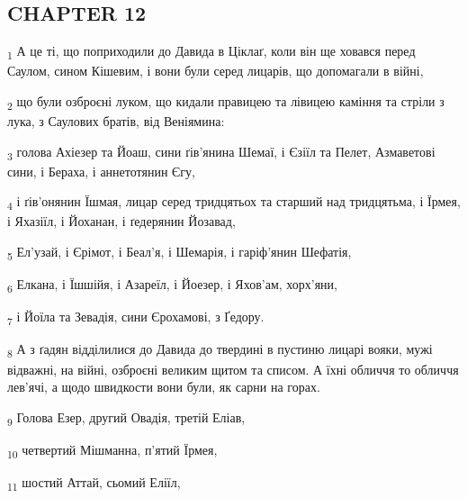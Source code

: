 \subsection{CHAPTER 12}
\begin{tcolorbox}
\textsubscript{1} А це ті, що поприходили до Давида в Ціклаґ, коли він ще ховався перед Саулом, сином Кішевим, і вони були серед лицарів, що допомагали в війні,
\end{tcolorbox}
\begin{tcolorbox}
\textsubscript{2} що були озброєні луком, що кидали правицею та лівицею каміння та стріли з лука, з Саулових братів, від Веніямина:
\end{tcolorbox}
\begin{tcolorbox}
\textsubscript{3} голова Ахіезер та Йоаш, сини ґів'янина Шемаї, і Єзіїл та Пелет, Азмаветові сини, і Бераха, і аннетотянин Єгу,
\end{tcolorbox}
\begin{tcolorbox}
\textsubscript{4} і ґів'онянин Їшмая, лицар серед тридцятьох та старший над тридцятьма, і Їрмея, і Яхазіїл, і Йоханан, і ґедерянин Йозавад,
\end{tcolorbox}
\begin{tcolorbox}
\textsubscript{5} Ел'узай, і Єрімот, і Беал'я, і Шемарія, і гаріф'янин Шефатія,
\end{tcolorbox}
\begin{tcolorbox}
\textsubscript{6} Елкана, і Їшшійя, і Азареїл, і Йоезер, і Яхов'ам, хорх'яни,
\end{tcolorbox}
\begin{tcolorbox}
\textsubscript{7} і Йоїла та Зевадія, сини Єрохамові, з Ґедору.
\end{tcolorbox}
\begin{tcolorbox}
\textsubscript{8} А з ґадян відділилися до Давида до твердині в пустиню лицарі вояки, мужі відважні, на війні, озброєні великим щитом та списом. А їхні обличчя то обличчя лев'ячі, а щодо швидкости вони були, як сарни на горах.
\end{tcolorbox}
\begin{tcolorbox}
\textsubscript{9} Голова Езер, другий Овадія, третій Еліав,
\end{tcolorbox}
\begin{tcolorbox}
\textsubscript{10} четвертий Мішманна, п'ятий Їрмея,
\end{tcolorbox}
\begin{tcolorbox}
\textsubscript{11} шостий Аттай, сьомий Еліїл,
\end{tcolorbox}
